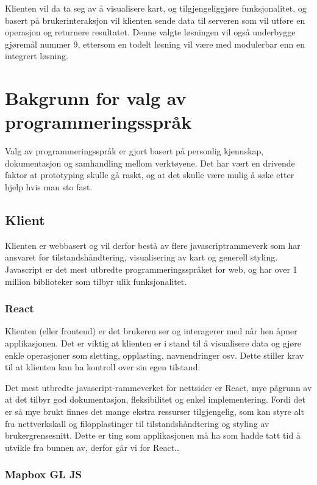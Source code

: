 Klienten vil da ta seg av å visualisere kart, og tilgjengeliggjøre funksjonalitet, og basert på brukerinteraksjon vil klienten sende data til serveren som vil utføre en operasjon og returnere resultatet. Denne valgte løsningen vil også underbygge gjøremål nummer 9, ettersom en todelt løsning vil være med modulerbar enn en integrert løsning. 



\section{Bakgrunn for valg av programmeringsspråk}

Valg av programmeringsspråk er gjort basert på personlig kjennskap, dokumentasjon og samhandling mellom verktøyene. Det har vært en drivende faktor at prototyping skulle gå raskt, og at det skulle være mulig å søke etter hjelp hvis man sto fast. 

\subsection{Klient}

Klienten er webbasert og vil derfor bestå av flere javascriptrammeverk som har ansvaret for tilstandshåndtering, visualisering av kart og generell styling. Javascript er det mest utbredte programmeringsspråket for web, og har over 1 million biblioteker som tilbyr ulik funksjonalitet. 

\subsubsection{React}

Klienten (eller frontend) er det brukeren ser og interagerer med når hen åpner applikasjonen. Det er viktig at klienten er i stand til å visualisere data og gjøre enkle operasjoner som sletting, opplasting, navnendringer osv. Dette stiller krav til at klienten kan ha kontroll over sin egen tilstand. 

Det mest utbredte javascript-rammeverket for nettsider er React, mye pågrunn av at det tilbyr god dokumentasjon, fleksibilitet og enkel implementering. Fordi det er så mye brukt finnes det mange ekstra ressurser tilgjengelig, som kan styre alt fra nettverkskall og filopplastinger til tilstandshåndtering og styling av brukergrensesnitt. Dette er ting som applikasjonen må ha som hadde tatt tid å utvikle fra bunnen av, derfor går vi for React\dots

\subsubsection{Mapbox GL JS}


